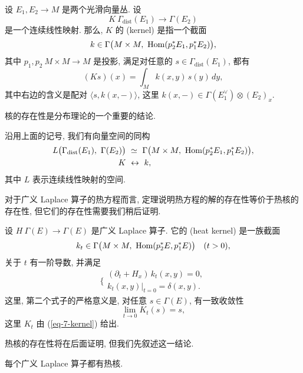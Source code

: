 \begin{definition}
    设 $E_1, E_2 \to M$ 是两个光滑向量丛. 设
    \[ K \: \Gamma_{\mathrm{dist}} (E_1) \to \Gamma (E_2) \]
    是一个连续线性映射. 那么, $K$ 的 (kernel) 是指一个截面
    \[ k \in \Gamma \bigl( M \times M, \ \operatorname{Hom} (p_2^* E_1, p_1^* E_2) \bigr), \]
    其中 $p_1, p_2 \: M \times M \to M$ 是投影,
    满足对任意的 $s \in \Gamma_{\mathrm{dist}} (E_1)$, 都有
    \begin{equation} \label{eq-7-kernel}
        (K s) (x) = \int_M k (x, y) \, s (y) \, dy,
    \end{equation}
    其中右边的含义是配对 $\langle s, k(x, -) \rangle$,
    这里 $k (x, -) \in \Gamma (E_1^\vee) \otimes (E_2)_x$.
\end{definition}

核的存在性是分布理论的一个重要的结论.

\begin{theorem} 
    沿用上面的记号, 我们有向量空间的同构
    \begin{align*}
        L \bigl( \Gamma_{\mathrm{dist}} (E_1), \ \Gamma (E_2) \bigr) \ 
            & \simeq \ \Gamma \bigl( M \times M, \ \Hom (p_2^* E_1, p_1^* E_2) \bigr), \\
        K \ & \leftrightarrow \ k,
    \end{align*} 
    其中 $L$ 表示连续线性映射的空间.
\end{theorem}

对于广义 Laplace 算子的热方程而言,
定理说明热方程的解的存在性等价于热核的存在性,
但它们的存在性需要我们稍后证明.

\begin{definition}
    设 $H \: \Gamma (E) \to \Gamma (E)$ 是广义 Laplace 算子.
    它的 (heat kernel) 是一族截面
    \[ k_t \in \Gamma \bigl( M \times M, \ \operatorname{Hom} (p_2^* E, p_1^* E) \bigr)
        \quad (t > 0), \]
    关于 $t$ 有一阶导数, 并满足
    \[ \Biggl \{ \begin{array}{l}
        (\partial_t + H_x) \, k_t (x, y) = 0, \\
        k_t (x, y) |_{t=0} = \delta (x, y).
    \end{array} \]
    这里, 第二个式子的严格意义是, 对任意 $s \in \Gamma(E)$, 有一致收敛性
    \[ \lim _{t \to 0} K_t (s) = s, \]
    这里 $K_t$ 由 (\ref{eq-7-kernel}) 给出.
\end{definition}

热核的存在性将在后面证明, 但我们先叙述这一结论.

\begin{theorem} \label{thm-7-heat-ker-exists}
    每个广义 Laplace 算子都有热核.
\end{theorem}


